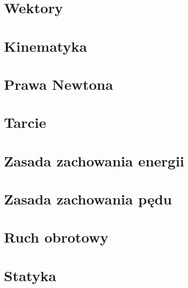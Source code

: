 \documentclass[xcolor]{beamer}
\begin{document}
\section{Wektory}
\section{Kinematyka}
\section{Prawa Newtona}
\section{Tarcie}
\section{Zasada zachowania energii}
\section{Zasada zachowania pędu}
\section{Ruch obrotowy}
\section{Statyka}
\end{document}
